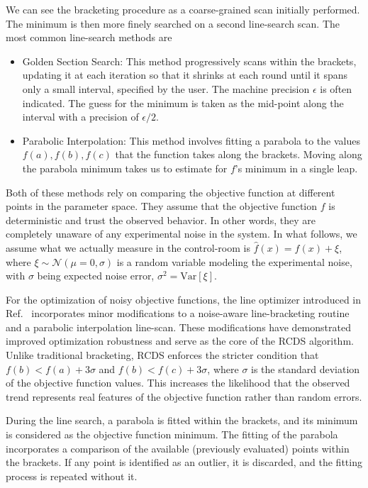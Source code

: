 We can see the bracketing procedure as a coarse-grained scan initially performed. The minimum is then more finely searched on a second line-search scan. The most common line-search methods are
\begin{itemize}
    \item Golden Section Search: This method progressively scans within the brackets, updating it at each iteration so that it shrinks at each round until it spans only a small interval, specified by the user. The machine precision $\epsilon$ is often indicated. The guess for the minimum is taken as the mid-point along the interval with a precision of $\epsilon/2$.
    \item Parabolic Interpolation: This method involves fitting a parabola to the values $f(a), f(b), f(c)$ that the function takes along the brackets. Moving along the parabola minimum takes us to estimate for $f$'s minimum in a single leap.
\end{itemize}
Both of these methods rely on comparing the objective function at different points in the parameter space. They assume that the objective function $f$ is deterministic and trust the observed behavior. In other words, they are completely unaware of any experimental noise in the system. In what follows, we assume what we actually measure in the control-room is $\hat{f}(x)=f(x) + \xi$, where $\xi\sim\mathcal{N}(\mu=0, \sigma)$ is a random variable modeling the experimental noise, with $\sigma$ being expected noise error, $\sigma^2 = \text{Var}[\xi]$.

For the optimization of noisy objective functions, the line optimizer introduced in Ref.~\cite{huang_algorithm_2013} incorporates minor modifications to a noise-aware line-bracketing routine and a parabolic interpolation line-scan. These modifications have demonstrated improved optimization robustness and serve as the core of the RCDS algorithm. Unlike traditional bracketing, RCDS enforces the stricter condition that $f(b) < f(a) + 3\sigma$ and $f(b) < f(c) + 3\sigma$, where $\sigma$ is the standard deviation of the objective function values. This increases the likelihood that the observed trend represents real features of the objective function rather than random errors.

During the line search, a parabola is fitted within the brackets, and its minimum is considered as the objective function minimum. The fitting of the parabola incorporates a comparison of the available (previously evaluated) points within the brackets. If any point is identified as an outlier, it is discarded, and the fitting process is repeated without it.

